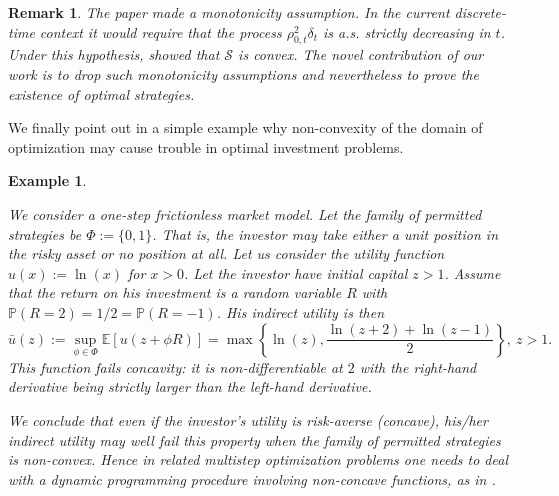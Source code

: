 \documentclass[a4paper]{article}
\newtheorem{remark}[theorem]{Remark}
\newtheorem{example}[theorem]{Example}
\begin{document}
\begin{remark}\label{megjegyzes}{\rm The paper \cite{peter-yan} made a monotonicity
assumption. In the current discrete-time context it would require that the process $\rho_{0,t}^{2}\delta_{t}$ is a.s.
strictly decreasing in $t$. 
Under this hypothesis, \cite{peter-yan} showed that $\mathcal{S}$ is convex. The novel
contribution of our work is to drop such monotonicity assumptions and nevertheless to prove the existence 
of optimal strategies.}
\end{remark}







We finally point out in a simple example why
non-convexity of the domain of optimization may cause trouble in optimal investment problems.

\begin{example}\label{noncon}
{\rm We consider a one-step frictionless market model. 
Let the family of permitted strategies be $\Phi:=\{0,1\}$. That is, the investor
may take either a unit position in the risky asset or no position at all. Let us consider the utility function 
$u(x):=\ln(x)$ for $x>0$. 
Let the investor have initial capital $z>1$. Assume that the return on his investment is
a random variable $R$ with  $\mathbb{P}(R=2)=1/2=\mathbb{P}(R=-1)$. His indirect utility is then 
$$
\bar{u}(z):=\sup_{\phi\in\Phi} \mathbb{E}[u(z+\phi R)]=\max\left\{\ln(z),{}
\frac{\ln(z+2)+\ln(z-1)}{2}\right\},\ z>1.
$$
This function fails concavity: it is non-differentiable
at $2$ with the right-hand derivative being strictly larger than the left-hand derivative.

We conclude that even if the investor's utility is risk-averse (concave), his/her \emph{indirect} utility
may well fail this property when the family of permitted strategies is non-convex. Hence
in related multistep optimization problems
one needs to deal with a dynamic programming procedure involving \emph{non-concave} 
functions, as in \cite{laurence}.}
\end{example}
\end{document}
